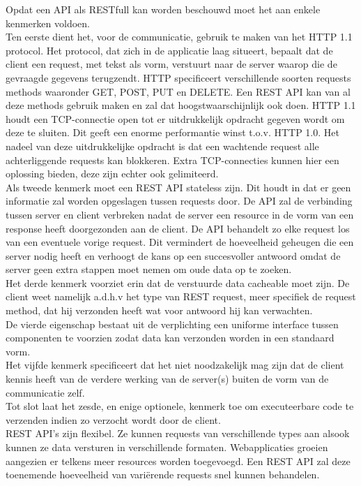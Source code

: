 Opdat een API als RESTfull kan worden beschouwd moet het aan enkele kenmerken voldoen.\\
Ten eerste dient het, voor de communicatie, gebruik te maken van het HTTP 1.1 protocol. Het protocol, dat zich in de applicatie laag situeert,
bepaalt dat de client een request, met tekst als vorm, verstuurt naar de server waarop die de gevraagde gegevens terugzendt.
HTTP specificeert verschillende soorten requests methods waaronder GET, POST, PUT en DELETE. Een REST API kan van al deze methods gebruik maken en zal dat
hoogstwaarschijnlijk ook doen. HTTP 1.1 houdt een TCP-connectie open tot er uitdrukkelijk opdracht gegeven wordt om deze te sluiten.
Dit geeft een enorme performantie winst t.o.v. HTTP 1.0. Het nadeel van deze uitdrukkelijke opdracht is dat een wachtende request alle achterliggende requests kan blokkeren.
Extra TCP-connecties kunnen hier een oplossing bieden, deze zijn echter ook gelimiteerd.
~\autocite{w3Protocol}\\
Als tweede kenmerk moet een REST API stateless zijn. Dit houdt in dat er geen informatie zal worden opgeslagen tussen requests door.
De API zal de verbinding tussen server en client verbreken nadat de server een resource in de vorm van een response heeft doorgezonden aan de client.
De API behandelt zo elke request los van een eventuele vorige request. Dit vermindert de hoeveelheid geheugen die een server nodig heeft en verhoogt de
kans op een succesvoller antwoord omdat de server geen extra stappen moet nemen om oude data op te zoeken.\\
Het derde kenmerk voorziet erin dat de verstuurde data cacheable moet zijn. De client weet namelijk a.d.h.v het type van REST request,
meer specifiek de request method, dat hij verzonden heeft wat voor antwoord hij kan verwachten.\\
De vierde eigenschap bestaat uit de verplichting een uniforme interface tussen componenten te voorzien zodat data kan verzonden worden in een standaard vorm.\\
Het vijfde kenmerk specificeert dat het niet noodzakelijk mag zijn dat de client kennis heeft van de verdere werking van de server(s) buiten de vorm van de communicatie zelf.\\
Tot slot laat het zesde, en enige optionele, kenmerk toe om executeerbare code te verzenden indien zo verzocht wordt door de client.
~\autocite{redhat}\\

REST API's zijn flexibel. Ze kunnen requests van verschillende types aan alsook kunnen ze data versturen in verschillende formaten.
Webapplicaties groeien aangezien er telkens meer resources worden toegevoegd. Een REST API zal deze toenemende hoeveelheid van variërende requests snel kunnen behandelen.\\

